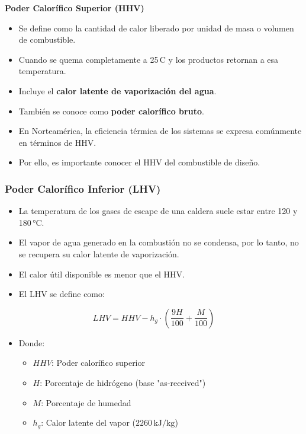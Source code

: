 \documentclass[../../main.tex]{subfiles}
\begin{document}
\begin{frame}{\textbf{Poder Calor\'ifico Superior (HHV)}}
\begin{itemize}
    \item Se define como la cantidad de calor liberado por unidad de masa o volumen de combustible.
    \item Cuando se quema completamente a 25\,\textdegree C y los productos retornan a esa temperatura.
    \item Incluye el \textbf{calor latente de vaporizaci\'on del agua}.
    \item Tambi\'en se conoce como \textbf{poder calor\'ifico bruto}.
    \item En Norteam\'erica, la eficiencia t\'ermica de los sistemas se expresa com\'unmente en t\'erminos de HHV.
    \item Por ello, es importante conocer el HHV del combustible de dise\~no.
\end{itemize}
\end{frame}

\begin{frame}
\frametitle{Poder Calorífico Inferior (LHV)}

\begin{itemize}
  \item La temperatura de los gases de escape de una caldera suele estar entre 120 y 180 °C.
  \item El vapor de agua generado en la combustión no se condensa, por lo tanto, no se recupera su calor latente de vaporización.
  \item El calor útil disponible es menor que el HHV.
  \item El LHV se define como:
\end{itemize}

\[
LHV = HHV - h_g \cdot \left( \frac{9H}{100} + \frac{M}{100} \right)
\]

\begin{itemize}
  \item Donde:
  \begin{itemize}
    \item $HHV$: Poder calorífico superior
    \item $H$: Porcentaje de hidrógeno (base "as-received")
    \item $M$: Porcentaje de humedad
    \item $h_g$: Calor latente del vapor ($2260 \, \text{kJ/kg}$)
  \end{itemize}
\end{itemize}

\end{frame}
\end{document}
